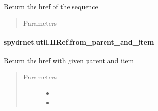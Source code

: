 \documentclass[letterpaper,10pt,english,openany,oneside]{sphinxmanual}
\begin{document}
\begin{fulllineitems}
\label{\detokenize{reference/classes/generated/spydrnet.util.HRef.from_sequence:spydrnet.util.HRef.from_sequence}}
Return the href of the sequence
\begin{quote}\begin{description}
\item[{Parameters}] \leavevmode
{}

\end{description}\end{quote}

\end{fulllineitems}



\paragraph{spydrnet.util.HRef.from\_parent\_and\_item}
\label{\detokenize{reference/classes/generated/spydrnet.util.HRef.from_parent_and_item:spydrnet-util-href-from-parent-and-item}}\label{\detokenize{reference/classes/generated/spydrnet.util.HRef.from_parent_and_item::doc}}

\begin{fulllineitems}
\label{\detokenize{reference/classes/generated/spydrnet.util.HRef.from_parent_and_item:spydrnet.util.HRef.from_parent_and_item}}
Return the href with given parent and item
\begin{quote}\begin{description}
\item[{Parameters}] \leavevmode\begin{itemize}
\item {} 

\item {} 

\end{itemize}

\end{description}\end{quote}

\end{fulllineitems}
\end{document}
